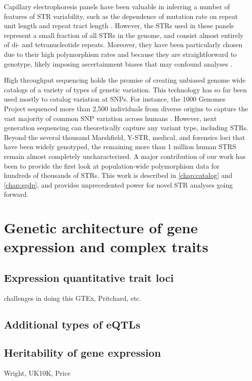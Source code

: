 Capillary electrophoresis panels have been valuable in inferring a number of features of STR variability, such as the dependence of mutation rate on repeat unit length \cite{JarveZhivotovskyRootsiEtAl2009} and repeat tract length \cite{SunHelgasonMassonEtAl2012}. However, the STRs used in these panels represent a small fraction of all STRs in the genome, and consist almost entirely of di- and tetranucleotide repeats. Moreover, they have been particularly chosen due to their high polymorphism rates and because they are straightforward to genotype, likely imposing ascertainment biases that may confound analyses \cite{ErikssonManicaScherer2011}.

High throughput sequencing holds the promise of creating unbiased genome wide catalogs of a variety of types of genetic variation. This technology has so far been used mostly to catalog variation at SNPs. For instance, the 1000 Genomes Project sequenced more than 2,500 individuals from diverse origins to capture the vast majority of common SNP variation across humans \cite{AbecasisAltshulerAutonEtAl2010}. However, next generation sequencing can theoretically capture any variant type, including STRs. Beyond the several thousand Marshfield, Y-STR, medical, and forensics loci that have been widely genotyped, the remaining more than 1 million human STRS remain almost completely uncharacterized. A major contribution of our work has been to provide the first look at population-wide polymorphism data for hundreds of thousands of STRs. This work is described in \autoref{chap:catalog} and \autoref{chap:sgdp}, and provides unprecedented power for novel STR analyses going forward.

\section{Genetic architecture of gene expression and complex traits}
\label{sec:introarch}
\subsection{Expression quantitative trait loci}
challenges in doing this
GTEx, Pritchard, etc.
\subsection{Additional types of eQTLs}
\subsection{Heritability of gene expression}
Wright, UK10K, Price
